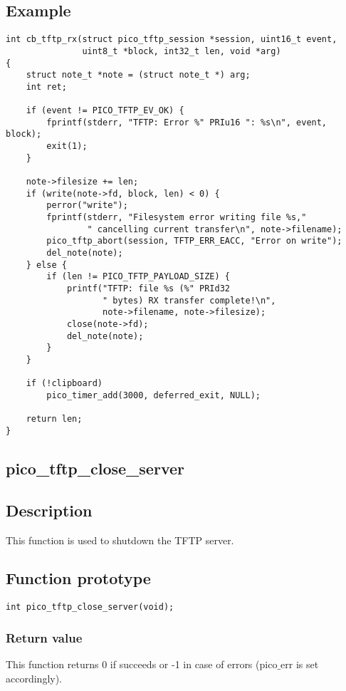 \subsection*{Example}
\begin{verbatim}
int cb_tftp_rx(struct pico_tftp_session *session, uint16_t event,
               uint8_t *block, int32_t len, void *arg)
{
    struct note_t *note = (struct note_t *) arg;
    int ret;

    if (event != PICO_TFTP_EV_OK) {
        fprintf(stderr, "TFTP: Error %" PRIu16 ": %s\n", event, block);
        exit(1);
    }

    note->filesize += len;
    if (write(note->fd, block, len) < 0) {
        perror("write");
        fprintf(stderr, "Filesystem error writing file %s,"
                " cancelling current transfer\n", note->filename);
        pico_tftp_abort(session, TFTP_ERR_EACC, "Error on write");
        del_note(note);
    } else {
        if (len != PICO_TFTP_PAYLOAD_SIZE) {
            printf("TFTP: file %s (%" PRId32
                   " bytes) RX transfer complete!\n",
                   note->filename, note->filesize);
            close(note->fd);
            del_note(note);
        }
    }

    if (!clipboard)
        pico_timer_add(3000, deferred_exit, NULL);

    return len;
}
\end{verbatim}


\subsection{pico\_tftp\_close\_server}

\subsection*{Description}
This function is used to shutdown the TFTP server.

\subsection*{Function prototype}
\begin{verbatim}
int pico_tftp_close_server(void);
\end{verbatim}

\subsubsection*{Return value}
This function returns 0 if succeeds or -1 in case of errors (pico$\_$err is set accordingly).

